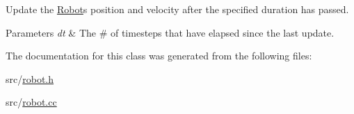 Update the \hyperlink{classRobot}{Robot}\textquotesingle{}s position and velocity after the specified duration has passed. 


\begin{DoxyParams}{Parameters}
{\em dt} & The \# of timesteps that have elapsed since the last update. \\
\hline
\end{DoxyParams}


The documentation for this class was generated from the following files\+:\begin{DoxyCompactItemize}
\item 
src/\hyperlink{robot_8h}{robot.\+h}\item 
src/\hyperlink{robot_8cc}{robot.\+cc}\end{DoxyCompactItemize}
